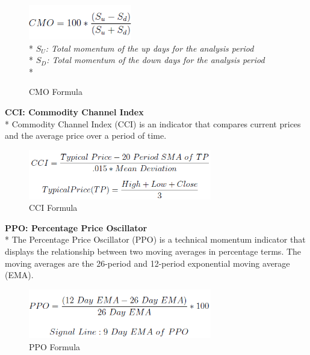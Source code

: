 \documentclass{article}
\begin{document}
\begin{figure}[H]
\begin{center}
   \includegraphics[width=45mm,scale=0.8]{assets/formulas/cmo.png}\\*
   \textit{$S_U$: Total momentum of the up days for the analysis period}\vspace{0.1cm}\\*
   \textit{$S_D$: Total momentum of the down days for the analysis period}\vspace{0.2cm}\\*
   \caption{CMO Formula}
\end{center}
\end{figure}
\noindent
\textbf{CCI: Commodity Channel Index} \\*
Commodity Channel Index (CCI) is an indicator that compares current prices and the average price over a period of time.
\begin{figure}[H]
\begin{center}
   \includegraphics[width=80mm,scale=0.8]{assets/formulas/cci.png}
   \caption{CCI Formula}
\end{center}
\end{figure}
\noindent
\textbf{PPO: Percentage Price Oscillator} \\*
The Percentage Price Oscillator (PPO) is a technical momentum indicator that displays the relationship between two moving averages in percentage terms. The moving averages are the 26-period and 12-period exponential moving average (EMA).
\begin{figure}[H]
\begin{center}
   \includegraphics[width=80mm,scale=0.8]{assets/formulas/ppo.png}
   \caption{PPO Formula}
\end{center}
\end{figure}
\end{document}
